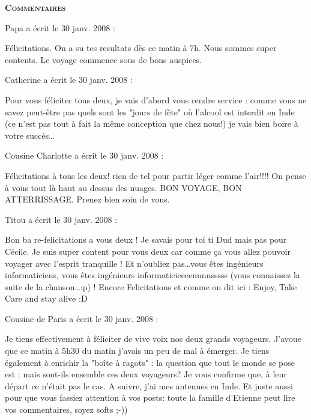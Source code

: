 \bigskip
\textbf{\textsc{Commentaires}}

\medskip
Papa a écrit le 30 janv. 2008 :
\begin{displayquote}
Félicitations. On a su tes resultats dès ce matin à 7h. Nous sommes super contents. Le voyage commence sous de bons auspices.
\end{displayquote}

\medskip
Catherine a écrit le 30 janv. 2008 :
\begin{displayquote}
Pour vous féliciter tous deux, je vais d'abord vous rendre service : comme vous ne savez peut-être pas quels sont les "jours de fête" où l'alcool est interdit en Inde (ce n'est pas tout à fait la même conception que chez nous!) je vais bien boire à votre succès\dots
\end{displayquote}

\medskip
Cousine Charlotte a écrit le 30 janv. 2008 :
\begin{displayquote}
Félicitations à tous les deux! rien de tel pour partir léger comme l'air!!!! On pense à vous tout là haut au dessus des nuages. BON VOYAGE, BON ATTERRISSAGE. Prenez bien soin de vous.
\end{displayquote}

\medskip
Titou a écrit le 30 janv. 2008 :
\begin{displayquote}
Bon ba re-felicitations a vous deux ! Je savais pour toi ti Dud mais pas pour Cécile. Je suis super content pour vous deux car comme ça vous allez pouvoir voyager avec l'esprit tranquille ! Et n'oubliez pas\dots vous êtes ingénieurs informaticiens, vous êtes ingénieurs informaticieeeennnnsssss (vous connaissez la suite de la chanson\dots :p) ! Encore Felicitations et comme on dit ici : Enjoy, Take Care and stay alive :D
\end{displayquote}

\medskip
Cousine de Paris a écrit le 30 janv. 2008 :
\begin{displayquote}
Je tiens effectivement à féliciter de vive voix nos deux grands voyageurs. J'avoue que ce matin à 5h30 du matin j'avais un peu de mal à émerger.
Je tiens également à enrichir la "boîte à ragots" : la question que tout le monde se pose est : mais sont-ils ensemble ces deux voyageurs? Je vous confirme que, à leur départ ce n'était pas le cas. A suivre, j'ai mes antennes en Inde.
Et juste aussi pour que vous fassiez attention à vos posts: toute la famille d'Etienne peut lire vos commentaires, soyez softs ;-))
\end{displayquote}

